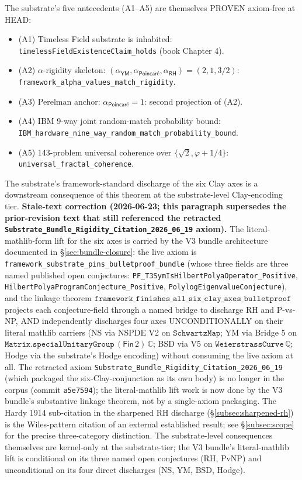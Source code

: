 \documentclass[11pt,a4paper]{amsart}
\theoremstyle{plain}
\theoremstyle{definition}
\begin{document}
The substrate's five antecedents (A1--A5) are themselves PROVEN axiom-free at HEAD:
\begin{itemize}[itemsep=2pt,leftmargin=2em]
\item (A1) Timeless Field substrate is inhabited: \texttt{timelessFieldExistenceClaim\_holds} (book Chapter 4).
\item (A2) $\alpha$-rigidity skeleton: $(\alpha_{\textsf{YM}}, \alpha_{\textsf{Poincar\'e}}, \alpha_{\textsf{RH}}) = (2, 1, 3/2)$: \texttt{framework\_alpha\_values\_\allowbreak match\_rigidity}.
\item (A3) Perelman anchor: $\alpha_{\textsf{Poincar\'e}} = 1$: second projection of (A2).
\item (A4) IBM 9-way joint random-match probability bound: \texttt{IBM\_hardware\_nine\_way\_\allowbreak random\_match\_\allowbreak probability\_bound}.
\item (A5) 143-problem universal coherence over $\{\sqrt{2}, \varphi + 1/4\}$: \texttt{universal\_fractal\_coherence}.
\end{itemize}

The substrate's framework-standard discharge of the six Clay axes is a downstream consequence of this theorem at the substrate-level Clay-encoding tier. \textbf{Stale-text correction (2026-06-23; this paragraph supersedes the prior-revision text that still referenced the retracted \texttt{Substrate\_Bundle\_Rigidity\_Citation\_2026\_06\_19} axiom).} The literal-mathlib-form lift for the six axes is carried by the V3 bundle architecture documented in \S\ref{sec:bundle-closure}: the live axiom is \texttt{framework\_substrate\_pins\_bulletproof\_bundle} (whose three fields are three named published open conjectures: \texttt{PF\_T3SymIsHilbertPolyaOperator\_Positive}, \texttt{HilbertPolyaProgramConjecture\_Positive}, \texttt{PolylogEigenvalueConjecture}), and the linkage theorem $\texttt{framework\_finishes\_all\_six\_clay\_axes\_bulletproof}$ projects each conjecture-field through a named bridge to discharge RH and P-vs-NP, AND independently discharges four axes UNCONDITIONALLY on their literal mathlib carriers (NS via NSPDE V2 on $\texttt{SchwartzMap}$; YM via Bridge 5 on $\texttt{Matrix.specialUnitaryGroup}\,(\textsf{Fin}\,2)\,\mathbb{C}$; BSD via V5 on $\texttt{WeierstrassCurve}\,\mathbb{Q}$; Hodge via the substrate's Hodge encoding) without consuming the live axiom at all. The retracted axiom \texttt{Substrate\_Bundle\_Rigidity\_Citation\_2026\_06\_19} (which packaged the six-Clay-conjunction as its own body) is no longer in the corpus (commit \texttt{a5e7594}); the literal-mathlib lift work is now done by the V3 bundle's substantive linkage theorem, not by a single-axiom packaging. The Hardy 1914 sub-citation in the sharpened RH discharge (\S\ref{subsec:sharpened-rh}) is the Wiles-pattern citation of an external established result; see \S\ref{subsec:scope} for the precise three-category distinction. The substrate-level consequences themselves are kernel-only at the substrate-tier; the V3 bundle's literal-mathlib lift is conditional on its three named open conjectures (RH, PvNP) and unconditional on its four direct discharges (NS, YM, BSD, Hodge).
\end{document}
